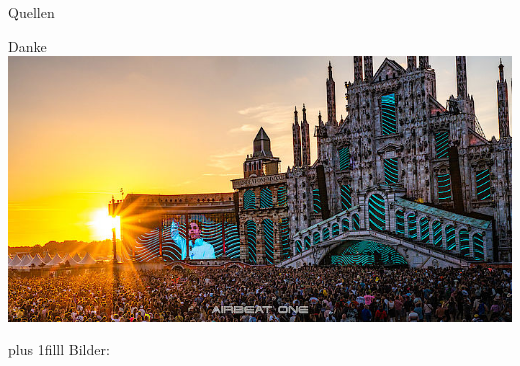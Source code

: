 \documentclass[Nike]{tuberlinbeamer}
\newcommand{\customcite}[1]{
	\vskip0pt plus 1filll
	\color{grau}
	\raggedleft \tiny Bilder: \cite{#1}
}
\begin{document}
\begin{frame}{Quellen}
\nocite{cover, banner}
\scriptsize

\end{frame}
\begin{frame}{Danke}
	\includegraphics[width=\textwidth - 13pt]{pictures/led-matrix-beispiel}
	\customcite{led_matrix_lightshow}
\end{frame}
\end{document}
